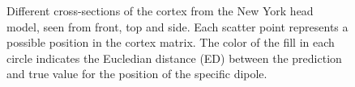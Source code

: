 \documentclass[a4paper, UKenglish, 11pt]{uiomaster}
\begin{document}
\begin{figure}[ht]
    \caption{Different cross-sections of the cortex from the New York head model, seen from front, top and side. Each scatter point represents a possible position in the cortex matrix. The color of the fill in each circle indicates the Eucledian distance (ED) between the prediction and true value for the position of the specific dipole.}
    \label{fig:MED_crossections}
\end{figure}
\end{document}
